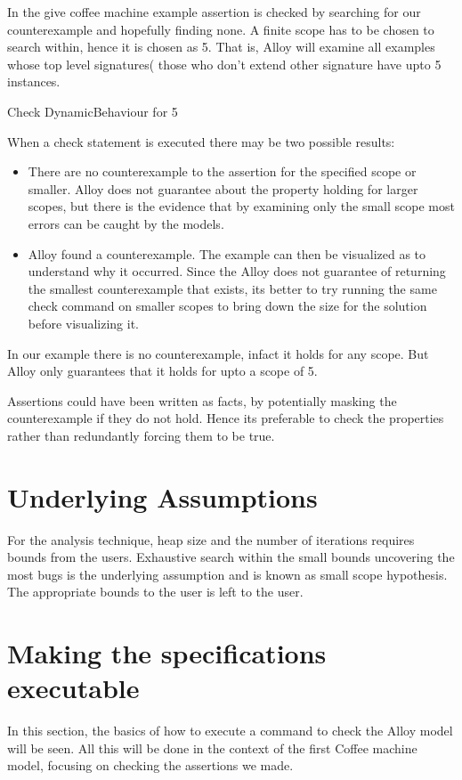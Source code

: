 \documentclass[a4paper,12pt]{report}
\begin{document}
In the give coffee machine example assertion is checked by searching for our counterexample and hopefully finding none. A finite scope has to be chosen to search within, hence it is chosen as 5. That is, Alloy will examine all examples whose top level signatures( those who don't extend other signature have upto 5 instances.

Check DynamicBehaviour for 5

When a check statement is executed there may be two possible results:
\begin{itemize}
\item There are no counterexample to the assertion for the specified scope or smaller. Alloy does not guarantee about the property holding for larger scopes, but there is the evidence that by examining only the small scope most errors can be caught by the models. 
\item Alloy found a counterexample. The example can then be visualized as to understand why it occurred. Since the Alloy does not guarantee of returning the smallest counterexample that exists, its better to try running the same check command on smaller scopes to bring down the size for the solution before visualizing it. 
\end{itemize}
In our example there is no counterexample, infact it holds for any scope. But Alloy only guarantees that it holds for upto a scope of 5.

Assertions could have been written as facts, by potentially masking the counterexample if they do not hold. Hence its preferable to check the properties rather than redundantly forcing them to be true. 

\section{Underlying Assumptions}
\label{Assumptions}
For the analysis technique, heap size and the number of iterations requires bounds from the users\cite{Vaziri-Farahani2004}. Exhaustive search within the small bounds uncovering the most bugs is the underlying assumption and is known as small scope hypothesis. The appropriate bounds to the user is left to the user. 

\section{Making the specifications executable}
\label{Make spec exec}

In this section, the basics of how to execute a command to check the Alloy model will be seen. All this will be done in the context of the first Coffee machine model, focusing on checking the assertions we made. 
\end{document}
